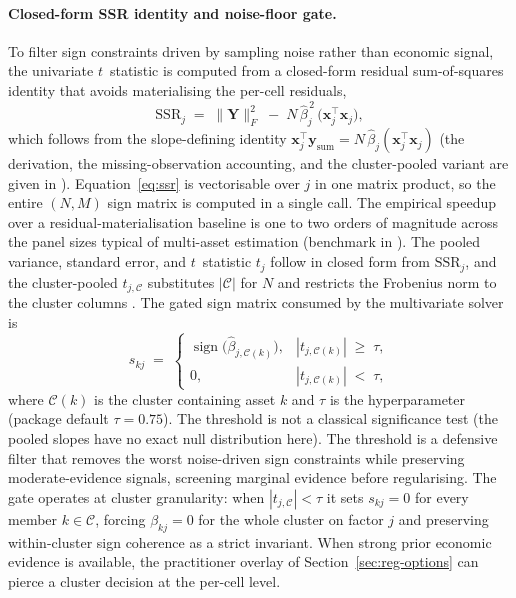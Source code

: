 \documentclass[article]{jss}
\begin{document}
\paragraph{Closed-form SSR identity and noise-floor gate.}
To filter sign constraints driven by sampling noise rather than
economic signal, the univariate $t$~statistic is computed from a
closed-form residual sum-of-squares identity that avoids materialising
the per-cell residuals,
%
\begin{equation} \label{eq:ssr}
\mathrm{SSR}_j \;=\; \| \bm{Y} \|_F^2 \;-\;
N\, \hat{\beta}_j^{\,2}\, \bigl(\bm{x}_j^\top \bm{x}_j\bigr),
\end{equation}
%
which follows from the slope-defining identity
$\bm{x}_j^\top \bm{y}_{\mathrm{sum}} = N\, \hat{\beta}_j (\bm{x}_j^\top \bm{x}_j)$
(the derivation, the missing-observation accounting, and the cluster-pooled
variant are given in \citealt{Sepp+Kastenholz:2026sign}). Equation~\ref{eq:ssr} is
vectorisable over $j$ in one matrix product, so the entire $(N, M)$
sign matrix is computed in a single  call. The
empirical speedup over a residual-materialisation baseline is one to
two orders of magnitude across the panel sizes typical of multi-asset
estimation (benchmark in ). The pooled
variance, standard error, and $t$~statistic $t_j$ follow in closed form
from $\mathrm{SSR}_j$, and the cluster-pooled $t_{j, \mathcal{C}}$
substitutes $|\mathcal{C}|$ for $N$ and restricts the Frobenius norm to
the cluster columns \citep{Sepp+Kastenholz:2026sign}. The gated sign
matrix consumed by the multivariate solver is
%
\begin{equation} \label{eq:gate}
s_{kj} \;=\;
\begin{cases}
	\operatorname{sign}\bigl(\hat{\beta}_{j, \mathcal{C}(k)}\bigr), &
	|t_{j, \mathcal{C}(k)}| \;\geq\; \tau, \\
	0, & |t_{j, \mathcal{C}(k)}| \;<\; \tau,
\end{cases}
\end{equation}
%
where $\mathcal{C}(k)$ is the cluster containing asset $k$ and $\tau$ is
the  hyperparameter (package default
$\tau = 0.75$). The threshold is not a classical significance test (the
pooled slopes have no exact null distribution here). The threshold is a defensive
filter that removes the worst noise-driven sign constraints while
preserving moderate-evidence signals, screening marginal evidence before
regularising. The gate operates at cluster granularity: when
$|t_{j, \mathcal{C}}| < \tau$ it sets $s_{kj} = 0$ for every member
$k \in \mathcal{C}$, forcing $\beta_{kj} = 0$ for the whole cluster on
factor $j$ and preserving within-cluster sign coherence as a strict
invariant. When strong prior economic evidence is available, the
practitioner overlay of Section~\ref{sec:reg-options} can pierce a cluster
decision at the per-cell level.
\end{document}
